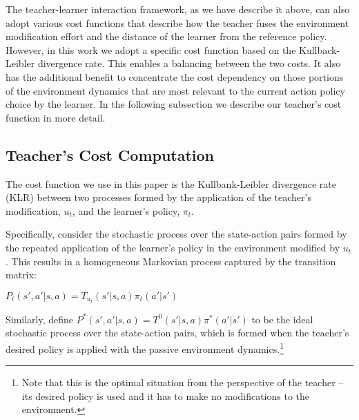 The teacher-learner interaction framework, as we have describe it
above, can also adopt various cost functions that describe how the
teacher fuses the environment modification effort and the distance of
the learner from the reference policy. However, in this work we adopt
a specific cost function based on the Kullback-Leibler divergence
rate. This enables a balancing between the two costs. It also
has the additional benefit to concentrate the cost dependency on those
portions of the environment dynamics that are most relevant to the
current action policy choice by the learner. In the following
subsection we describe our teacher's cost function in more detail.

\subsection{Teacher's Cost Computation}

The cost function we use in this paper is the Kullbank-Leibler divergence rate (KLR) between two processes formed by the application of the teacher's modification, $u_t$, and the learner's policy,
 $\pi_t$.


Specifically, consider 
%
the stochastic process over the state-action pairs formed by the
repeated application of the learner's policy in the environment
modified by $u_t$. This results in  a homogeneous Markovian process captured 
by the transition matrix: \\ \centerline{$
  P_t(s',a'|s,a)=T_{u_t}(s'|s,a)\pi_t(a'|s') $}

Similarly, define $P^*(s',a'|s,a)=T^0(s'|s,a)\pi^*(a'|s')$ to be the
ideal stochastic process over the state-action pairs, which is formed when the teacher's desired policy is applied with the passive environment dynamics.\footnote{Note that this is the optimal situation from the perspective of the teacher -- its desired policy is used and it has to make no modifications to the environment.} 

